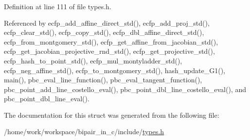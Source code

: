 Definition at line 111 of file types.\-h.



Referenced by ecfp\-\_\-add\-\_\-affine\-\_\-direct\-\_\-std(), ecfp\-\_\-add\-\_\-proj\-\_\-std(), ecfp\-\_\-clear\-\_\-std(), ecfp\-\_\-copy\-\_\-std(), ecfp\-\_\-dbl\-\_\-affine\-\_\-direct\-\_\-std(), ecfp\-\_\-from\-\_\-montgomery\-\_\-std(), ecfp\-\_\-get\-\_\-affine\-\_\-from\-\_\-jacobian\-\_\-std(), ecfp\-\_\-get\-\_\-jacobian\-\_\-projective\-\_\-rnd\-\_\-std(), ecfp\-\_\-get\-\_\-projective\-\_\-std(), ecfp\-\_\-hash\-\_\-to\-\_\-point\-\_\-std(), ecfp\-\_\-mul\-\_\-montyladder\-\_\-std(), ecfp\-\_\-neg\-\_\-affine\-\_\-std(), ecfp\-\_\-to\-\_\-montgomery\-\_\-std(), hash\-\_\-update\-\_\-\-G1(), main(), pbc\-\_\-eval\-\_\-line\-\_\-function(), pbc\-\_\-eval\-\_\-tangent\-\_\-function(), pbc\-\_\-point\-\_\-add\-\_\-line\-\_\-costello\-\_\-eval(), pbc\-\_\-point\-\_\-dbl\-\_\-line\-\_\-costello\-\_\-eval(), and pbc\-\_\-point\-\_\-dbl\-\_\-line\-\_\-eval().



The documentation for this struct was generated from the following file\-:\begin{DoxyCompactItemize}
\item 
/home/work/workspace/bipair\-\_\-in\-\_\-c/include/\hyperlink{types_8h}{types.\-h}\end{DoxyCompactItemize}
